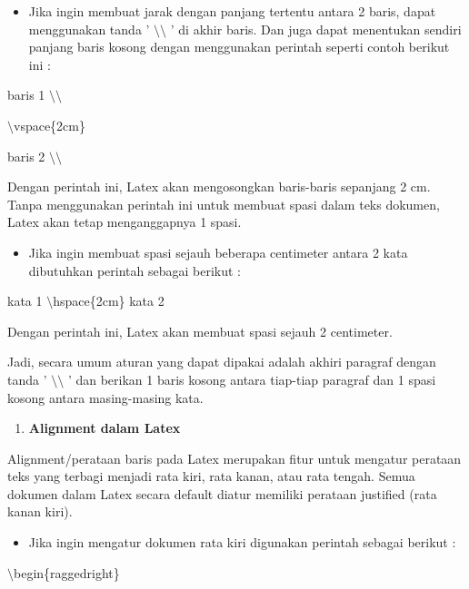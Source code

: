 \begin{itemize}
\item Jika ingin membuat jarak dengan panjang tertentu antara 2 baris, dapat menggunakan tanda ' $\setminus$$\setminus$ ' di akhir baris. Dan juga dapat menentukan sendiri panjang baris kosong dengan menggunakan perintah seperti contoh berikut ini :
\end{itemize}
\hspace{0,2in}baris 1 $\setminus$$\setminus$

$\setminus$vspace\{2cm\}

baris 2 $\setminus$$\setminus$

\par \vspace{12pt}

Dengan perintah ini, Latex akan mengosongkan baris-baris sepanjang 2 cm. Tanpa menggunakan perintah ini untuk membuat spasi dalam teks dokumen, Latex akan tetap menganggapnya 1 spasi.

\begin{itemize}
\item Jika ingin membuat spasi sejauh beberapa centimeter antara 2 kata dibutuhkan perintah sebagai berikut :
\end{itemize}
\hspace{0,5in}kata 1 $\setminus$hspace\{2cm\} kata 2\par \vspace{12pt}

Dengan perintah ini, Latex akan membuat spasi sejauh 2 centimeter.

Jadi, secara umum aturan yang dapat dipakai adalah akhiri paragraf dengan tanda ' $\setminus$$\setminus$ ' dan berikan 1 baris kosong antara tiap-tiap paragraf dan 1 spasi kosong antara masing-masing kata.

\begin{enumerate}
\setcounter{enumi}{\thenumberedCntB}
\item \textbf{Alignment dalam Latex}
\setcounter{numberedCntB}{\theenumi}
\end{enumerate}
\hspace{0,5in}Alignment/perataan baris pada Latex merupakan fitur untuk mengatur perataan teks yang terbagi menjadi rata kiri, rata kanan, atau rata tengah. Semua dokumen dalam Latex secara default diatur memiliki perataan justified (rata kanan kiri).

\begin{itemize}
\item Jika ingin mengatur dokumen rata kiri digunakan perintah sebagai berikut :
\end{itemize}
\hspace{0,5in}$\setminus$begin\{raggedright\}

